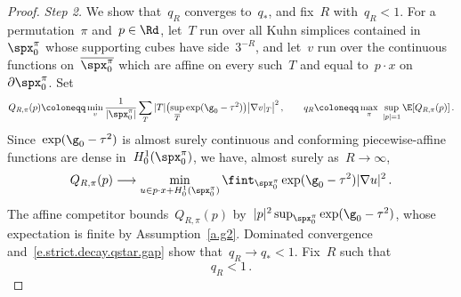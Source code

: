\documentclass[11pt]{amsart}
\begin{document}
\begin{proof}
\smallskip

	\emph{Step 2.} We show that~$q_R$ converges to~$q_*$, and fix~$R$ with~$q_R<1$. For a permutation~$\pi$ and~$p\in\Rd$, let~$T$ run over all Kuhn simplices contained in~$\spx_0^\pi$ whose supporting cubes have side~$3^{-R}$, and let~$v$ run over the continuous functions on~$\overline{\spx_0^\pi}$ which are affine on every such~$T$ and equal to~$p\cdot x$ on~$\partial\spx_0^\pi$.  Set
	\begin{equation}
		Q_{R,\pi}(p)
		\coloneqq
		\min_{v}
		\frac1{|\spx_0^\pi|}
		\sum_{T}
		|T|\bigl(\sup_{\overline T}\exp(\g_0-\tau^2)\bigr)
		\bigl|\nabla v\vert_T\bigr|^2\,,
		\qquad
		q_R
		\coloneqq
		\max_{\pi}\
		\sup_{|p|=1}\E[Q_{R,\pi}(p)]\,.
		\label{e.strict.decay.qR.def}
	\end{equation}
	Since~$\exp(\g_0-\tau^2)$ is almost surely continuous and conforming piecewise-affine functions are dense in~$H_0^1(\spx_0^\pi)$, we have, almost surely as~$R\to\infty$,
	\begin{equation*}
		Q_{R,\pi}(p)
		\longrightarrow
		\min_{u\in p\cdot x+H_0^1(\spx_0^\pi)}
		\fint_{\spx_0^\pi}\exp(\g_0-\tau^2)|\nabla u|^2\,.
	\end{equation*}
	The affine competitor bounds~$Q_{R,\pi}(p)$ by~$|p|^2\sup_{\spx_0^\pi}\exp(\g_0-\tau^2)$, whose expectation is finite by Assumption~\ref{a.g2}.  Dominated convergence and~\eqref{e.strict.decay.qstar.gap} show that~$q_R\to q_*<1$. Fix~$R$ such that
	\begin{equation}
		q_R<1\,.
		\label{e.strict.decay.qR.gap}
	\end{equation}

\smallskip


\end{proof}
\end{document}

